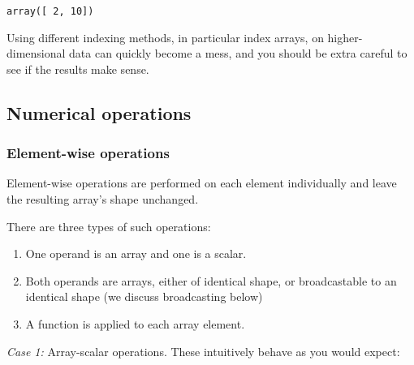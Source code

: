 \documentclass{scrartcl}
\makeatletter
\providecommand{\tightlist}{%
      \setlength{\itemsep}{0pt}\setlength{\parskip}{0pt}}
\newcommand{\boxspacing}{\kern\kvtcb@left@rule\kern\kvtcb@boxsep}
\newcommand{\prompt}[4]{
        {\ttfamily\llap{{\color{#2}[#3]:\hspace{3pt}#4}}\vspace{-\baselineskip}}
    }
\makeatother
\begin{document}
            \begin{tcolorbox}[breakable, size=fbox, boxrule=.5pt, pad at break*=1mm, opacityfill=0]
\prompt{Out}{outcolor}{28}{\boxspacing}
\begin{Verbatim}[commandchars=\\\{\}]
array([ 2, 10])
\end{Verbatim}
\end{tcolorbox}
        
    Using different indexing methods, in particular index arrays, on
higher-dimensional data can quickly become a mess, and you should be
extra careful to see if the results make sense.


\hypertarget{numerical-operations}{%
\subsection{Numerical operations}\label{numerical-operations}}

\hypertarget{element-wise-operations}{%
\subsubsection{Element-wise operations}\label{element-wise-operations}}

Element-wise operations are performed on each element individually and
leave the resulting array's shape unchanged.

There are three types of such operations:

\begin{enumerate}
\def\labelenumi{\arabic{enumi}.}
\tightlist
\item
  One operand is an array and one is a scalar.
\item
  Both operands are arrays, either of identical shape, or broadcastable
  to an identical shape (we discuss broadcasting below)
\item
  A function is applied to each array element.
\end{enumerate}

\emph{Case 1:} Array-scalar operations. These intuitively behave as you
would expect:
\end{document}
